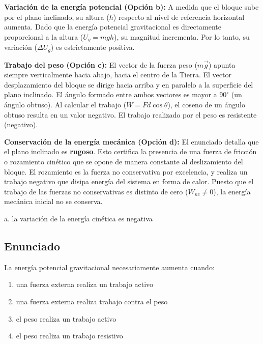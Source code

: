 \documentclass[12pt, a4paper]{article}
\begin{document}
\textbf{Variación de la energía potencial (Opción b):}
A medida que el bloque sube por el plano inclinado, su altura ($h$) respecto al nivel de referencia horizontal aumenta. Dado que la energía potencial gravitacional es directamente proporcional a la altura ($U_g = mgh$), su magnitud incrementa. Por lo tanto, su variación ($\Delta U_g$) es estrictamente positiva.

\textbf{Trabajo del peso (Opción c):}
El vector de la fuerza peso ($m\vec{g}$) apunta siempre verticalmente hacia abajo, hacia el centro de la Tierra. El vector desplazamiento del bloque se dirige hacia arriba y en paralelo a la superficie del plano inclinado. El ángulo formado entre ambos vectores es mayor a $90^\circ$ (un ángulo obtuso). Al calcular el trabajo ($W = F d \cos\theta$), el coseno de un ángulo obtuso resulta en un valor negativo. El trabajo realizado por el peso es resistente (negativo).

\textbf{Conservación de la energía mecánica (Opción d):}
El enunciado detalla que el plano inclinado es \textbf{rugoso}. Esto certifica la presencia de una fuerza de fricción o rozamiento cinético que se opone de manera constante al deslizamiento del bloque. El rozamiento es la fuerza no conservativa por excelencia, y realiza un trabajo negativo que disipa energía del sistema en forma de calor. Puesto que el trabajo de las fuerzas no conservativas es distinto de cero ($W_{nc} \neq 0$), la energía mecánica inicial no se conserva.

\begin{tcolorbox}[colback=green!5!white, colframe=green!50!black, title=Respuesta Correcta]
\centering \Large a. la variación de la energía cinética es negativa
\end{tcolorbox}

\newpage

\subsection*{Enunciado}
La energía potencial gravitacional necesariamente aumenta cuando:
\begin{enumerate}[label=\alph*.]
    \item una fuerza externa realiza un trabajo activo
    \item una fuerza externa realiza trabajo contra el peso
    \item el peso realiza un trabajo activo
    \item el peso realiza un trabajo resistivo
\end{enumerate}
\end{document}

